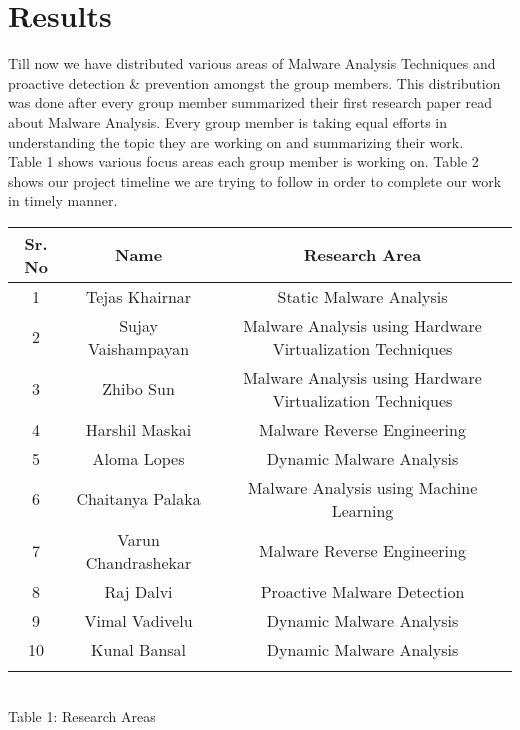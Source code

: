 \documentclass[16pt]{article}
\begin{document}
	\section{Results}
	Till now we have distributed various areas of Malware Analysis Techniques and proactive detection \& prevention amongst the group members. This distribution was done after every group member summarized their first research paper read about Malware Analysis. Every group member is taking equal efforts in understanding the topic they are working on and summarizing their work.\\ 
	Table 1 shows various focus areas each group member is working on. Table 2 shows our project timeline we are trying to follow in order to complete our work in timely manner.
	\begin{center}
		\begin{tabular}{ccc}
			\hline
			Sr. No & Name & Research Area\\
			\hline
			1 & Tejas Khairnar & Static Malware Analysis\\
			\hline
			2 & Sujay Vaishampayan & Malware Analysis using Hardware Virtualization	Techniques\\
			\hline
			3 & Zhibo Sun & Malware Analysis using Hardware Virtualization	Techniques\\
			\hline
			4 & Harshil Maskai & Malware Reverse Engineering\\
			\hline
			5 & Aloma Lopes & Dynamic Malware Analysis\\
			\hline
			6 & Chaitanya Palaka & Malware Analysis using Machine Learning\\
			\hline
			7 & Varun Chandrashekar & Malware Reverse Engineering\\
			\hline
			8 & Raj Dalvi & Proactive Malware Detection\\
			\hline
			9 & Vimal Vadivelu & Dynamic Malware Analysis\\
			\hline
			10 & Kunal Bansal & Dynamic Malware Analysis\\
			\hline\\
	\end{tabular}\\
	\caption{Table 1: Research Areas} \label{table: Research Areas}
	\end{center}
\end{document}
